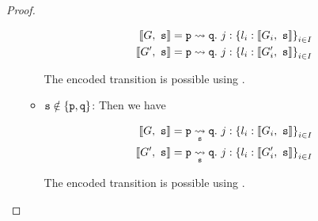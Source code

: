 \begin{proof}
\begin{itemize}
\begin{itemize}
\begin{align*}
\enc{G}{s} &= \gtrans{p}{q}{j}{l_i: \enc{G_i}{s}}{i \in I} \\
\enc{G'}{s} &= \gtrans{p}{q}{j}{l_i: \enc{G'_i}{s}}{i \in I} \\
\end{align*}

The encoded transition is possible using .

\item $\mrole{s} \notin \{ \mrole{p}, \mrole{q} \}$:
Then we have

\begin{align*}
\enc{G}{s} &= \gtransroute{p}{q}{s}{j}{l_i: \enc{G_i}{s}}{i \in I} \\
\enc{G'}{s} &= \gtransroute{p}{q}{s}{j}{l_i: \enc{G'_i}{s}}{i \in I} \\
\end{align*}

The encoded transition is possible using .

\end{itemize}

\end{itemize}

\end{proof}